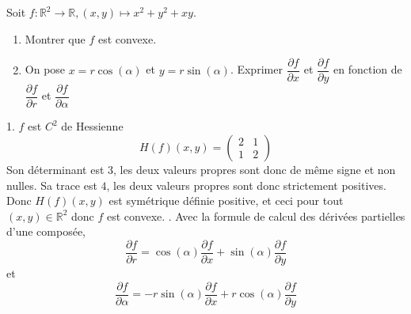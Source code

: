 \documentclass{fancybook}
\begin{document}
\begin{exercice}
Soit $f:\mathbb R^2\to \mathbb R, (x,y)\mapsto x^2+y^2+xy$.
\begin{enumerate}
\item Montrer que $f$ est convexe.
\item On pose $x=r\cos(\alpha)$ et $y=r\sin(\alpha)$.\newline
Exprimer $\dfrac{\partial f}{\partial x}$ et $\dfrac{\partial f}{\partial y}$ en fonction de $\dfrac{\partial f}{\partial r}$ et $\dfrac{\partial f}{\partial \alpha}$
\end{enumerate}
\end{exercice}
1. $f$ est $C^2$ de Hessienne $$H(f)(x,y)=\begin{pmatrix}
2 & 1\\
1 & 2
\end{pmatrix}$$
Son déterminant est $3$, les deux valeurs propres sont donc de même signe et non nulles. Sa trace est $4$, les deux valeurs propres sont donc strictement positives. Donc $H(f)(x,y)$ est symétrique définie positive, et ceci pour tout $(x,y)\in \mathbb R^2$ donc $f$ est convexe.\newline
{}. Avec la formule de calcul des dérivées partielles d'une composée, $$\dfrac{\partial f}{\partial r} = \cos(\alpha)\dfrac{\partial f}{\partial x} + \sin(\alpha)\dfrac{\partial f}{\partial y}$$
et 
$$\dfrac{\partial f}{\partial \alpha} = -r\sin(\alpha)\dfrac{\partial f}{\partial x} + r\cos(\alpha)\dfrac{\partial f}{\partial y}$$
\end{document}
